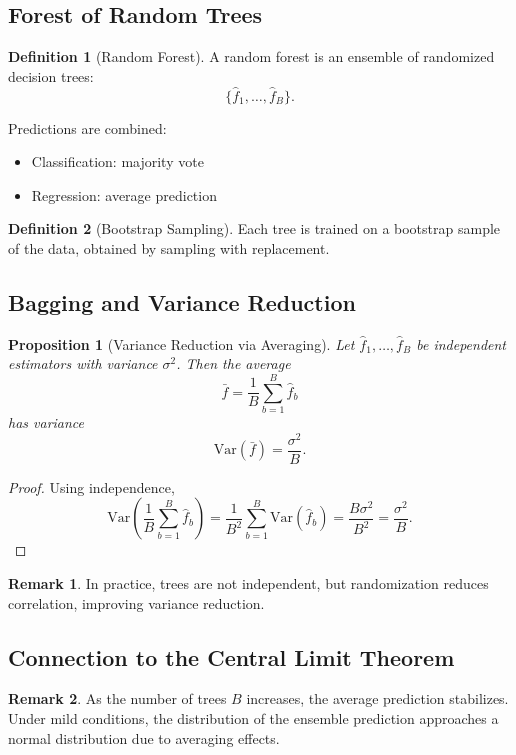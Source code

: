 \documentclass[12pt,oneside]{book}
\numberwithin{equation}{section}
\theoremstyle{definition}
\newtheorem{definition}{Definition}[section]
\newtheorem{remark}{Remark}[section]
\theoremstyle{plain}
\newtheorem{proposition}{Proposition}[section]
\theoremstyle{remark}
\newcommand{\Var}{\mathrm{Var}}
\begin{document}
\subsection{Forest of Random Trees}

\begin{definition}[Random Forest]
A random forest is an ensemble of randomized decision trees:
\[
\{\hat{f}_1,\dots,\hat{f}_B\}.
\]
\end{definition}

Predictions are combined:
\begin{itemize}
    \item Classification: majority vote
    \item Regression: average prediction
\end{itemize}

\begin{definition}[Bootstrap Sampling]
Each tree is trained on a bootstrap sample of the data, obtained by sampling with replacement.
\end{definition}

\subsection{Bagging and Variance Reduction}

\begin{proposition}[Variance Reduction via Averaging]
Let $\hat{f}_1,\dots,\hat{f}_B$ be independent estimators with variance $\sigma^2$. Then the average
\[
\bar{f}=\frac{1}{B}\sum_{b=1}^B \hat{f}_b
\]
has variance
\[
\Var(\bar{f})=\frac{\sigma^2}{B}.
\]
\end{proposition}

\begin{proof}
Using independence,
\[
\Var\left(\frac{1}{B}\sum_{b=1}^B \hat{f}_b\right)
=
\frac{1}{B^2}\sum_{b=1}^B \Var(\hat{f}_b)
=
\frac{B\sigma^2}{B^2}
=
\frac{\sigma^2}{B}.
\]
\end{proof}

\begin{remark}
In practice, trees are not independent, but randomization reduces correlation, improving variance reduction.
\end{remark}

\subsection{Connection to the Central Limit Theorem}

\begin{remark}
As the number of trees $B$ increases, the average prediction stabilizes. Under mild conditions, the distribution of the ensemble prediction approaches a normal distribution due to averaging effects.
\end{remark}
\end{document}
